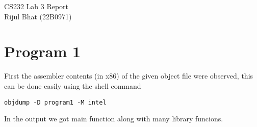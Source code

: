 \documentclass{article}
\begin{document}
\begin{titlepage}
    \vspace*{\fill}
    \begin{center}
      {\Huge CS232 Lab 3 Report}\\[0.5cm]
      {\Large Rijul Bhat (22B0971)}\\[0.4cm]
    \end{center}
    \vspace*{\fill}
  \end{titlepage}

\clearpage


\clearpage
\pagestyle{fancy}
\section{Program 1}
First the assembler contents (in x86) of the given object file were observed, this can be done easily using the shell command 
\begin{verbatim}
objdump -D program1 -M intel
\end{verbatim}
In the output we got main function along with many library funcions.
\end{document}

